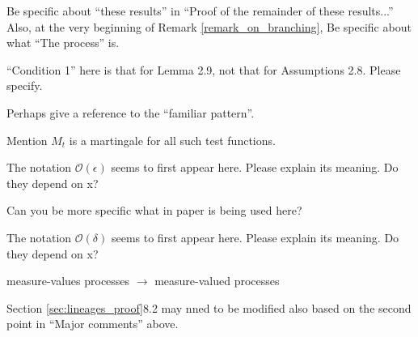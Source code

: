 \reply{
}

\begin{point}{\revref}
Be specific about ``these results'' in ``Proof of the remainder of these results...'' Also, at the
very beginning of Remark \ref{remark_on_branching}, Be specific about what ``The process'' is.
\end{point}

\reply{
}

\begin{point}{\revref}
``Condition 1'' here is that for Lemma 2.9, not that for Assumptions 2.8. Please specify.
\end{point}

\reply{
}

\begin{point}{\revref}
Perhaps give a reference to the ``familiar pattern''.
\end{point}

\reply{
}

\begin{point}{\revref}
Mention $M_t$ is a martingale for all such test functions.
\end{point}

\reply{
}

\begin{point}{\revref}
    The notation $\mathcal{O}(\epsilon)$ seems to first appear here. Please explain its meaning. Do they
depend on x?
\end{point}

\reply{
}

\begin{point}{\revref}
    Can you be more specific what in paper \citet{barlow/jacka/yor:1986} is being used here?
\end{point}

\reply{
}

\begin{point}{\revref}
The notation $\mathcal{O}(\delta)$ seems to first appear here. Please explain its meaning. Do they
depend on x?
\end{point}

\reply{
}

\begin{point}{\revref}
measure-values processes $\to$ measure-valued processes
\end{point}

\reply{
}

\begin{point}{}
Section \ref{sec:lineages_proof}8.2 may nned to be modified also based on the second point in ``Major
comments'' above.
\end{point}

\reply{
}


